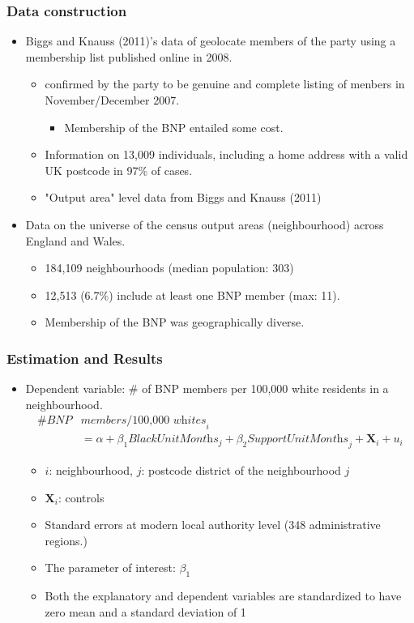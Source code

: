 \documentclass[dvipdfmx,11pt]{beamer}
\begin{document}
\begin{frame}\frametitle{Data construction}
  \begin{itemize}
    \item Biggs and Knauss (2011)'s data of geolocate members of the party using a membership list published online in 2008.
    \begin{itemize}
      \item confirmed by the party to be genuine and complete listing of menbers in November/December 2007.
      \begin{itemize}
        \item Membership of the BNP entailed some cost.
      \end{itemize}
      \item Information on 13,009 individuals, including a home address with a valid UK postcode in 97\% of cases.
      \item "Output area" level data from Biggs and Knauss (2011)
    \end{itemize}
    \item Data on the universe of the census output areas (neighbourhood) across England and Wales.
    \begin{itemize}
      \item 184,109 neighbourhoods (median population: 303)
      \item 12,513 (6.7\%) include at least one BNP member (max: 11).
      \item Membership of the BNP was geographically diverse.
    \end{itemize}
  \end{itemize}
\end{frame}

\begin{frame}\frametitle{Estimation and Results}
  \begin{itemize}
    \item Dependent variable: \# of BNP members per 100,000 white residents in a neighbourhood.
    \begin{align*}
      \textit{\# BNP} & \textit{members/100,000 whites}_i \\
      &= \alpha + \beta_1 \textit{BlackUnitMonths}_j
      + \beta_2 \textit{SupportUnitMonths}_j
      + \mathbf{X}_i + u_i \tag{1}
    \end{align*}
    \begin{itemize}
      \item $i$: neighbourhood, $j$: postcode district of the neighbourhood $j$
      \item $\mathbf{X}_i$: controls
      \item Standard errors at modern local authority level (348 administrative regions.)
      \item The parameter of interest: $\beta_1$
      \item Both the explanatory and dependent variables are standardized to have zero mean and a standard deviation of 1
    \end{itemize}
  \end{itemize}
\end{frame}
\end{document}
